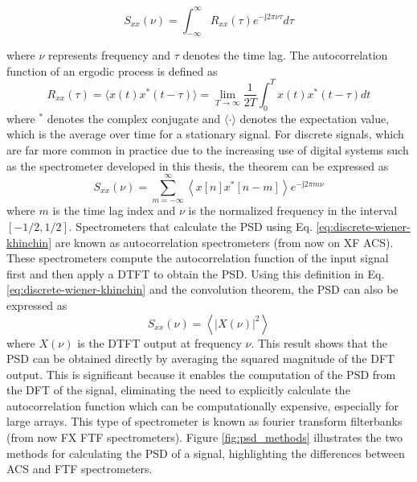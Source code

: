 \begin{equation}
	S_{xx}(\nu) = \int_{-\infty}^{\infty} R_{xx}(\tau) e^{- \mathrm{j} 2\pi \nu \tau} d\tau
	\label{eq:continous-wiener-khinchin}
\end{equation}

where $\nu$ represents frequency and $\tau$ denotes the time lag. The autocorrelation function of an ergodic process is defined as \citep{Gubner_2006}
\begin{equation}
	R_{xx}(\tau) =  \langle x(t) x^*(t - \tau)\rangle = \lim_{T \to \infty} \frac{1}{2T} \int_{0}^{T} x(t) x^*(t - \tau) dt
	\label{eq:continous_autocorrelation}
\end{equation}
where $^*$ denotes the complex conjugate and $\langle \cdot \rangle$ denotes the expectation value, which is the average over time for a stationary signal. For discrete signals, which are far more common in practice due to the increasing use of digital systems such as the spectrometer developed in this thesis, the theorem can be expressed as
\begin{equation}
	S_{xx}(\nu) = \sum_{m=-\infty}^{\infty} \left\langle x[n] x^*[n - m] \right\rangle e^{-\mathrm{j}2\pi m \nu}
	\label{eq:discrete-wiener-khinchin}
\end{equation}
where $m$ is the time lag index and $\nu$ is the normalized frequency in the interval $[-1/2,1/2]$. Spectrometers that calculate the PSD using Eq. \ref{eq:discrete-wiener-khinchin} are known as autocorrelation spectrometers (from now on XF ACS). These spectrometers compute the autocorrelation function of the input signal first and then apply a DTFT to obtain the PSD. Using this definition in Eq. \ref{eq:discrete-wiener-khinchin} and the convolution theorem, the PSD can also be expressed as
\begin{equation}
	S_{xx}(\nu) = \left\langle |X(\nu)|^2 \right\rangle
	\label{eq:discrete_psd}
\end{equation}
where $X(\nu)$ is the DTFT output at frequency $\nu$. This result shows that the PSD can be obtained directly by averaging the squared magnitude of the DFT output. This is significant because it enables the computation of the PSD from the DFT of the signal, eliminating the need to explicitly calculate the autocorrelation function which can be computationally expensive, especially for large arrays. This type of spectrometer is known as fourier transform filterbanks (from now FX FTF spectrometers). Figure \ref{fig:psd_methods} illustrates the two methods for calculating the PSD of a signal, highlighting the differences between ACS and FTF spectrometers.
